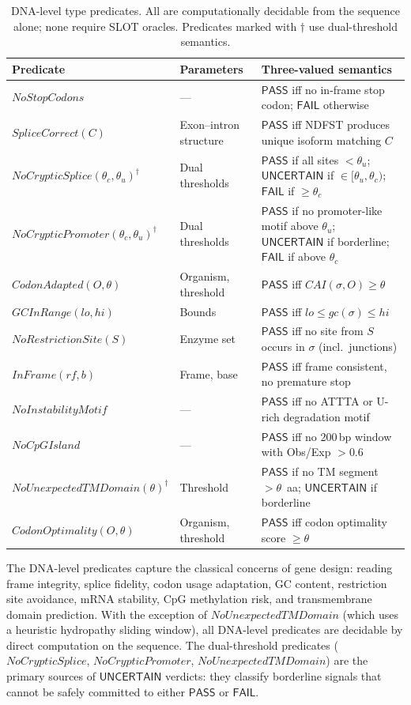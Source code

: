 \documentclass[acmsmall,review,anonymous]{acmart}
\newcommand{\PASS}{\ensuremath{\mathsf{PASS}}\xspace}
\newcommand{\FAIL}{\ensuremath{\mathsf{FAIL}}\xspace}
\newcommand{\UNCERTAIN}{\ensuremath{\mathsf{UNCERTAIN}}\xspace}
\newcommand{\seq}{\sigma}
\begin{document}
\begin{table}[t]
\centering
\caption{DNA-level type predicates. All are computationally decidable
         from the sequence alone; none require SLOT oracles.
         Predicates marked with $\dagger$ use dual-threshold
         semantics.}
\label{tab:dna-predicates}
\begin{tabular}{llp{4.6cm}}
\toprule
\textbf{Predicate} & \textbf{Parameters} & \textbf{Three-valued semantics} \\
\midrule
$\mathit{NoStopCodons}$ & --- &
  \PASS{} iff no in-frame stop codon; \FAIL{} otherwise \\
$\mathit{SpliceCorrect}(C)$ & Exon--intron structure &
  \PASS{} iff NDFST produces unique isoform matching $C$ \\
$\mathit{NoCrypticSplice}(\theta_c,\theta_u)^\dagger$ & Dual thresholds &
  \PASS{} if all sites $< \theta_u$; \UNCERTAIN{} if $\in
  [\theta_u, \theta_c)$; \FAIL{} if $\ge \theta_c$ \\
$\mathit{NoCrypticPromoter}(\theta_c,\theta_u)^\dagger$ & Dual thresholds &
  \PASS{} if no promoter-like motif above $\theta_u$; \UNCERTAIN{}
  if borderline; \FAIL{} if above $\theta_c$ \\
$\mathit{CodonAdapted}(O,\theta)$ & Organism, threshold &
  \PASS{} iff $\mathit{CAI}(\seq, O) \ge \theta$ \\
$\mathit{GCInRange}(lo,hi)$ & Bounds &
  \PASS{} iff $lo \le \mathit{gc}(\seq) \le hi$ \\
$\mathit{NoRestrictionSite}(S)$ & Enzyme set &
  \PASS{} iff no site from $S$ occurs in $\seq$ (incl.\ junctions) \\
$\mathit{InFrame}(rf,b)$ & Frame, base &
  \PASS{} iff frame consistent, no premature stop \\
$\mathit{NoInstabilityMotif}$ & --- &
  \PASS{} iff no ATTTA or U-rich degradation motif \\
$\mathit{NoCpGIsland}$ & --- &
  \PASS{} iff no 200\,bp window with Obs/Exp $> 0.6$ \\
$\mathit{NoUnexpectedTMDomain}(\theta)^\dagger$ & Threshold &
  \PASS{} if no TM segment $> \theta$~aa; \UNCERTAIN{} if
  borderline \\
$\mathit{CodonOptimality}(O,\theta)$ & Organism, threshold &
  \PASS{} iff codon optimality score $\ge \theta$ \\
\bottomrule
\end{tabular}
\end{table}

\noindent The DNA-level predicates capture the classical concerns of
gene design: reading frame integrity, splice fidelity, codon usage
adaptation, GC content, restriction site avoidance, mRNA stability,
CpG methylation risk, and transmembrane domain prediction.
With the exception of $\mathit{NoUnexpectedTMDomain}$ (which uses a
heuristic hydropathy sliding window), all DNA-level predicates are
decidable by direct computation on the sequence.
The dual-threshold predicates ($\mathit{NoCrypticSplice}$,
$\mathit{NoCrypticPromoter}$, $\mathit{NoUnexpectedTMDomain}$) are
the primary sources of \UNCERTAIN{} verdicts: they classify borderline
signals that cannot be safely committed to either \PASS{} or \FAIL{}.
\end{document}
